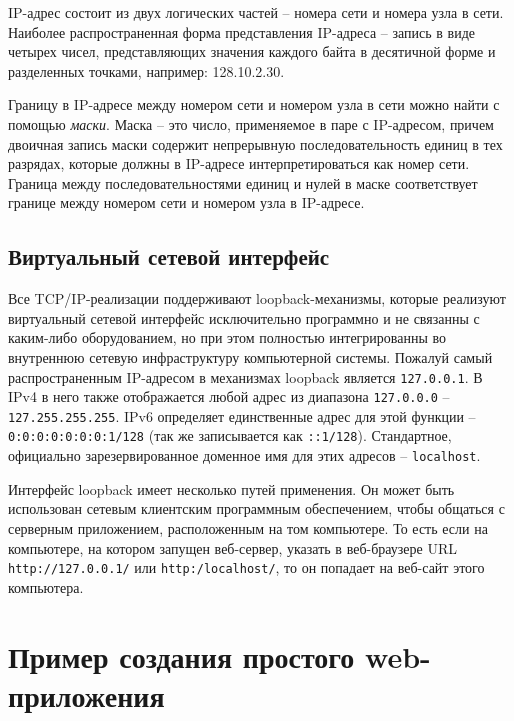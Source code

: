 \documentclass[%
	11pt,
	a4paper,
	utf8,
		]{article}
\begin{document}
IP-адрес состоит из двух логических частей -- номера сети и номера узла в сети. Наиболее распространенная форма представления IP-адреса -- запись в виде четырех чисел, представляющих значения каждого байта в десятичной форме и разделенных точками, например: 128.10.2.30.

Границу в IP-адресе между номером сети и номером узла в сети можно найти с помощью \emph{маски}. Маска -- это число, применяемое в паре с IP-адресом, причем двоичная запись маски содержит непрерывную последовательность единиц в тех разрядах, которые должны в IP-адресе интерпретироваться как номер сети. Граница между последовательностями единиц и нулей в маске соответствует границе между номером сети и номером узла в IP-адресе.

\subsection{Виртуальный сетевой интерфейс}

Все TCP/IP-реализации поддерживают loopback-механизмы, которые реализуют виртуальный сетевой интерфейс исключительно программно и не связанны с каким-либо оборудованием, но при этом полностью интегрированны во внутреннюю сетевую инфраструктуру компьютерной системы. Пожалуй самый распространенным IP-адресом в механизмах loopback является \texttt{127.0.0.1}. В IPv4 в него также отображается любой адрес из диапазона \texttt{127.0.0.0} -- \texttt{127.255.255.255}. IPv6 определяет единственные адрес для этой функции -- \texttt{0:0:0:0:0:0:0:1/128} (так же записывается как \texttt{::1/128}). Стандартное, официально зарезервированное доменное имя для этих адресов -- \texttt{localhost}.

Интерфейс loopback имеет несколько путей применения. Он может быть использован сетевым клиентским программным обеспечением, чтобы общаться с серверным приложением, расположенным на том компьютере. То есть если на компьютере, на котором запущен веб-сервер, указать в веб-браузере URL \texttt{http://127.0.0.1/} или \texttt{http:/localhost/}, то он попадает на веб-сайт этого компьютера.



\section{Пример создания простого web-приложения}
\end{document}
